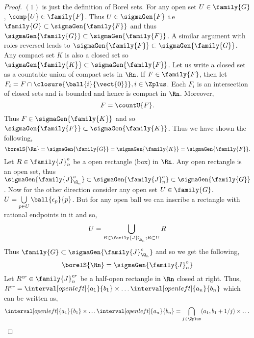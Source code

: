 \begin{proof}
    $(1)$ is just the definition of Borel sets. For any open set $U \in \family{G}$, $\comp{U} \in
    \family{F}$. Thus $U \in \sigmaGen{F}$ i.e $\family{G} \subset \sigmaGen{\family{F}}$ and thus
    $\sigmaGen{\family{G}} \subset \sigmaGen{\family{F}}$. A similar argument with roles reversed 
    leads to $\sigmaGen{\family{F}} \subset \sigmaGen{\family{G}}$. Any compact set $K$ is also a
    closed set so $\sigmaGen{\family{K}} \subset \sigmaGen{\family{F}}$. Let us write a closed set
    as a countable union of compact sets in $\Rn$. If $F \in \family{F}$, then let $F_i = F \cap
    \closure{\ball{i}{\vect{0}}}, i\in \Zplus$. Each $F_i$ is an intersection of closed sets and 
    is bounded and hence is compact in $\Rn$. Moreover,
    \begin{equation*}
	F = \countU{F}.
    \end{equation*}	
    Thus $F \in \sigmaGen{\family{K}}$ and so $\sigmaGen{\family{F}} \subset \sigmaGen{\family{K}}$.
    Thus we have shown the following,
    \begin{equation*}
	\borelS{\Rn} = \sigmaGen{\family{G}} = \sigmaGen{\family{K}} = \sigmaGen{\family{F}}.
    \end{equation*}
    Let $R \in \family{J}^{o}_{n}$ be a open rectangle (box) in $\Rn$. Any open rectangle is an open
    set, thus 
    $\sigmaGen{\family{J}^{o}_{\Q_{n}}} \subset \sigmaGen{\family{J}^{o}_{n}} 
    \subset \sigmaGen{\family{G}}$. Now for the other direction consider any open set $U \in
    \family{G}$. $U = \bigcup\limits_{p\in U}\ball{\epsilon_{p}}{p}$. But for any open ball we can
    inscribe a rectangle with rational endpoints in it and so,
    \begin{equation*}
	U = \bigcup\limits_{R \in \family{J}^{o}_{\Q_{n}};R \subset U}R
    \end{equation*}
    Thus $\family{G} \subset \sigmaGen{\family{J}^{o}_{\Q_{n}}}$ and so we get the following,
    \begin{equation*}
	\borelS{\Rn} = \sigmaGen{\family{J}^{o}_{n}}
    \end{equation*}
    Let $R^{cr} \in \family{J}^{cr}_{n}$ be a half-open rectangle in $\Rn$ closed at right.
    Thus, $R^{cr} = \interval[open left]{a_1}{b_1} \times \dots 
    \interval[open left]{a_n}{b_n}$ which can be written as,
    \begin{equation*}
	\interval[open left]{a_1}{b_1} \times \dots 
	\interval[open left]{a_n}{b_n} = \bigcap\limits_{j\in\Zplus}(a_1,b_1+1/j) \times \dots

\end{equation*}
\end{proof}
